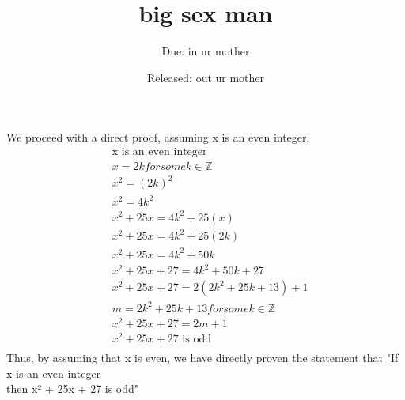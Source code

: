 \documentclass[11pt]{article}
\title{big sex man}
\author{Due: in ur mother}
\date{Released: out ur mother}
\begin{document}
\maketitle

\begin{mdframed}
    We proceed with a direct proof, assuming x is an even integer.
    \begin{align*}
        & \text{x is an even integer} \tag{given} \\
        & x = 2k for some k \in \mathbb{Z} \tag{def of even} \\
        & x^2 = (2k)^2 \tag{square both sides of (2)} \\
        & x^2 = 4k^2 \tag{simplify RHS of 3} \\
        & x^2+25x = 4k^2+25(x) \tag{add 25x to both sides of 4} \\
        & x^2+25x = 4k^2+25(2k) \tag{substitute (2) into (5)} \\
        & x^2+25x = 4k^2+50k \tag{simplify RHS of (6)} \\
        & x^2+25x+27 = 4k^2+50k+27 \tag{add 27 to both sides of (7)} \\
        & x^2+25x+27 = 2(2k^2+25k+13) + 1 \tag{factor RHS of (8)} \\
        & m = 2k^2+25k+13 for some k \in \mathbb{Z} \tag{closure of mult and add in Z} \\
        & x^2+25x+27 = 2m + 1 \tag{subsitute (10) into (9)} \\
        & x^2+25x+27 \text{ is odd} \tag{def of odd} \\
    \end{align*}
    Thus, by assuming that x is even, we have directly proven the statement that "If x is an even integer \\then x² + 25x + 27 is odd"  \\
\end{mdframed}
\end{document}
